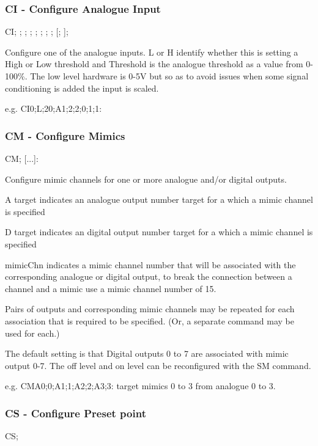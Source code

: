 \subsubsection{CI - Configure Analogue Input}
CI; ; ; ; ; ; ; ; [; ];

Configure one of the analogue inputs.
L or H identify whether this is setting a High or Low threshold and Threshold is the analogue threshold
as a value from 0-100\%. The low level hardware is 0-5V but so as to avoid issues when some signal
conditioning is added the input is scaled.

e.g.
CI0;L;20;A1;2;2;0;1;1:

\subsubsection{CM - Configure Mimics}
CM; [...]:

Configure mimic channels for one or more analogue and/or digital outputs.

      A target indicates an analogue output number target for a which a mimic channel is specified

      D target indicates an digital output number target for a which a mimic channel is specified

      mimicChn indicates a mimic channel number that will be associated with the corresponding 
      analogue or digital output, to break the connection between a channel and a mimic use a mimic channel
      number of 15.

Pairs of outputs and corresponding mimic channels may be repeated for each association that is 
required to be specified. (Or, a separate command may be used for each.)

The default setting is that Digital outputs 0 to 7 are associated with mimic output 0-7. The off level and
on level can be reconfigured with the SM command.

e.g.
CMA0;0;A1;1;A2;2;A3;3:
target mimics 0 to 3 from analogue 0 to 3.

\subsubsection{CS - Configure Preset point}
CS; 

